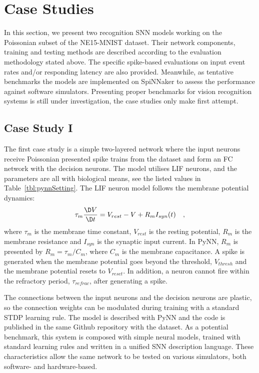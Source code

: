 \section{Case Studies}
\label{sec:test}
In this section, we present two recognition SNN models working on the Poissonian subset of the NE15-MNIST dataset.
Their network components, training and testing methods are described according to the evaluation methodology stated above.
The specific spike-based evaluations on input event rates and/or responding latency are also provided. 
Meanwhile, as tentative benchmarks the models are implemented on SpiNNaker to assess the performance against software simulators.
Presenting proper benchmarks for vision recognition systems is still under investigation, the case studies only make first attempt.

\subsection{Case Study I}
The first case study is a simple two-layered network where the input neurons receive Poissonian presented spike trains from the dataset and form an FC network with the decision neurons.
The model utilises LIF neurons, and the parameters are all with biological means, see the listed values in Table~\ref{tbl:pynnSetting}.
The LIF neuron model follows the membrane potential
dynamics:
\begin{equation}
    \tau_m \frac{\D V}{\D t}=V_{rest} - V + R_{m} I_{syn}(t) ~~~,
    \label{eq:LIF}
\end{equation}
where $\tau_m$ is the membrane time constant, $ V_{rest} $ is the resting potential, $ R_{m} $ is the membrane resistance and $ I_{syn} $ is the synaptic input current.
In PyNN, $ R_{m} $ is presented by $ R_{m}=\tau_m/C_{m} $, where $C_{m} $ is the membrane capacitance.
A spike is generated when the membrane potential goes beyond the threshold, $ V_{thresh} $ and the membrane potential resets to $V_{reset}$.
In addition, a neuron cannot fire within the refractory period, $ \tau_{refrac} $, after generating a spike.

The connections between the input neurons and the decision neurons are plastic, so the connection weights can be modulated during training with a standard STDP learning rule.
The model is described with PyNN and the code is published in
the same Github repository with the dataset.
As a potential benchmark, this system is composed with simple neural models, trained with standard learning rules and written in a unified SNN description language. These characteristics allow the same network to be tested on various simulators, both software- and hardware-based.

